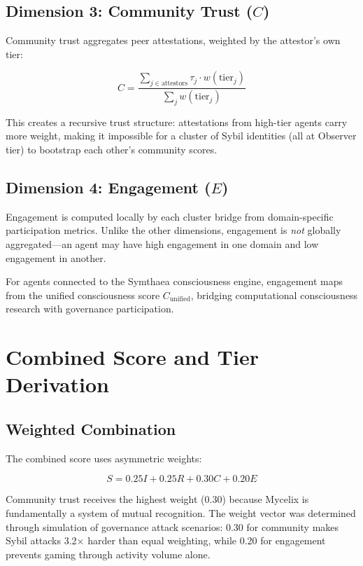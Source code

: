 \documentclass[11pt,twocolumn]{article}
\begin{document}
\subsection{Dimension 3: Community Trust ($C$)}

Community trust aggregates peer attestations, weighted by the attestor's
own tier:

\begin{equation}
  C = \frac{\sum_{j \in \text{attestors}} \tau_j \cdot w(\text{tier}_j)}{\sum_{j} w(\text{tier}_j)}
\end{equation}

This creates a recursive trust structure: attestations from high-tier
agents carry more weight, making it impossible for a cluster of Sybil
identities (all at Observer tier) to bootstrap each other's community
scores.

\subsection{Dimension 4: Engagement ($E$)}

Engagement is computed locally by each cluster bridge from domain-specific
participation metrics. Unlike the other dimensions, engagement is
\emph{not} globally aggregated---an agent may have high engagement in one
domain and low engagement in another.

For agents connected to the Symthaea consciousness engine, engagement maps
from the unified consciousness score $C_{\text{unified}}$, bridging
computational consciousness research with governance participation.

\section{Combined Score and Tier Derivation}

\subsection{Weighted Combination}

The combined score uses asymmetric weights:

\begin{equation}
  S = 0.25I + 0.25R + 0.30C + 0.20E
\end{equation}

Community trust receives the highest weight (0.30) because Mycelix is
fundamentally a system of mutual recognition. The weight vector was
determined through simulation of governance attack scenarios: 0.30 for
community makes Sybil attacks 3.2$\times$ harder than equal weighting,
while 0.20 for engagement prevents gaming through activity volume alone.
\end{document}
